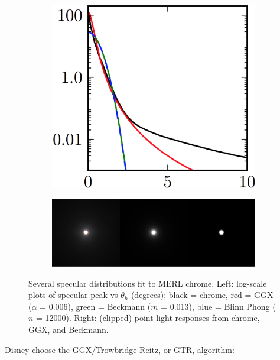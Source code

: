 \begin{figure}\label{f:specular-lob-tails}
\begin{center}
	\begin{subfigure}[b]{0.3\textwidth}
		\includegraphics[width=1.\textwidth]{graphics/gi/ray-optics-13-1}
	\end{subfigure}
	\begin{subfigure}[b]{0.68\textwidth}
		\includegraphics[width=1.\textwidth]{graphics/gi/ray-optics-13-2}
	\end{subfigure}
\end{center}
\caption{Several specular distributions fit to MERL chrome. Left: log-scale plots of specular peak vs $\theta_h$ (degrees); black = chrome, red = GGX ($\alpha$ = 0.006), green = Beckmann ($m$ = 0.013), blue = Blinn Phong ($n$ = 12000). Right: (clipped) point light responses from chrome, GGX, and Beckmann.}
\end{figure}

Disney choose the GGX/Trowbridge-Reitz, or GTR, algorithm:

